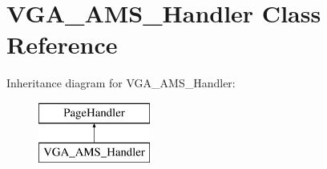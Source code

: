 \hypertarget{classVGA__AMS__Handler}{\section{V\-G\-A\-\_\-\-A\-M\-S\-\_\-\-Handler Class Reference}
\label{classVGA__AMS__Handler}
}
Inheritance diagram for V\-G\-A\-\_\-\-A\-M\-S\-\_\-\-Handler\-:\begin{figure}[H]
\begin{center}
\leavevmode
\includegraphics[height=2.000000cm]{classVGA__AMS__Handler}
\end{center}
\end{figure}
